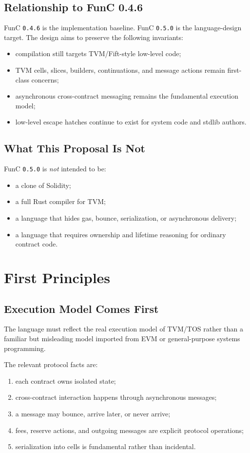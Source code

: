 \documentclass[12pt,oneside]{article}
\begin{document}
\subsection{Relationship to FunC 0.4.6}
FunC \verb|0.4.6| is the implementation baseline. FunC \verb|0.5.0| is the
language-design target. The design aims to preserve the following invariants:

\begin{itemize}
\item compilation still targets TVM/Fift-style low-level code;
\item TVM cells, slices, builders, continuations, and message actions remain
first-class concerns;
\item asynchronous cross-contract messaging remains the fundamental execution
model;
\item low-level escape hatches continue to exist for system code and stdlib
authors.
\end{itemize}

\subsection{What This Proposal Is Not}
FunC \verb|0.5.0| is \emph{not} intended to be:

\begin{itemize}
\item a clone of Solidity;
\item a full Rust compiler for TVM;
\item a language that hides gas, bounce, serialization, or asynchronous
delivery;
\item a language that requires ownership and lifetime reasoning for ordinary
contract code.
\end{itemize}

\section{First Principles}
\subsection{Execution Model Comes First}
The language must reflect the real execution model of TVM/TOS rather than a
familiar but misleading model imported from EVM or general-purpose systems
programming.

The relevant protocol facts are:

\begin{enumerate}
\item each contract owns isolated state;
\item cross-contract interaction happens through asynchronous messages;
\item a message may bounce, arrive later, or never arrive;
\item fees, reserve actions, and outgoing messages are explicit protocol
operations;
\item serialization into cells is fundamental rather than incidental.
\end{enumerate}
\end{document}
